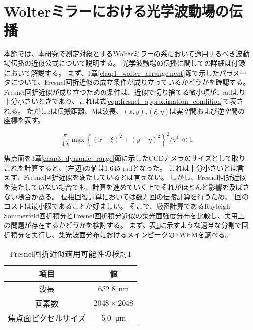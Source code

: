 \section{Wolterミラーにおける光学波動場の伝播}
\label{chap2_wolter_diffraction_apporoximation}
本節では、本研究で測定対象とするWolterミラーの系において適用するべき波動場伝播の近似公式について説明する。
光学波動場の伝播に関しての詳細は付録において解説する。
まず、1章\ref{chap1_wolter_arrangement}節で示したパラメータについて、Fresnel回折近似の成立条件が成り立っているかどうかを確認する。
Fresnel回折近似が成り立つための条件は、近似で切り捨てる微小項が1 radより十分小さいときであり、これは式\ref{eqn:fresnel_approximation_condition}で表される。
ただし$z$は伝搬距離、$\lambda$は波長、$(x, y), (\xi, \eta)$は実空間および逆空間の座標を表す。

\begin{equation}
\label{eqn:fresnel_approximation_condition}
    \frac{\pi}{4\lambda} \max \left\{ (x-\xi)^2 + (y-\eta)^2 \right\}^2 / z^3 \ll 1
\end{equation}

焦点面を3章\ref{chap3_dynamic_range}節に示したCCDカメラのサイズとして取りこれを計算すると、(左辺)の値は1.645 radとなった。
これは十分小さいとは言えず、Fresnel回折近似を満たしているとは言えない。
しかし、Fresnel回折近似を満たしていない場合でも、計算を進めていく上でそれがほとんど影響を及ぼさない場合がある。
位相回復計算においては数万回の伝搬計算を行うため、1回のコストは最小限であることが好ましい。
そこで、厳密計算であるRayleigh-Sommerfeld回折積分とFresnel回折積分近似の集光面強度分布を比較し、実用上の問題が存在するかどうかを検討する。
まず、表\ref{tb:check_approximation_validity_1}に示すような適当な分割で回折積分を実行し、集光波面分布におけるメインピークのFWHMを調べる。

\begin{table}[!ht]
\begin{center}
  \begin{tabular}{|c|c|} \hline
    項目 & 値 \\ \hline
    波長 & 632.8 nm \\
    画素数 & $2048 \times 2048$ \\
    焦点面ピクセルサイズ & \SI{5.0}{\micro \metre} \\ \hline
  \end{tabular}
  \caption{Fresnel回折近似適用可能性の検討1}
  \label{tb:check_approximation_validity_1}
\end{center}
\end{table}


